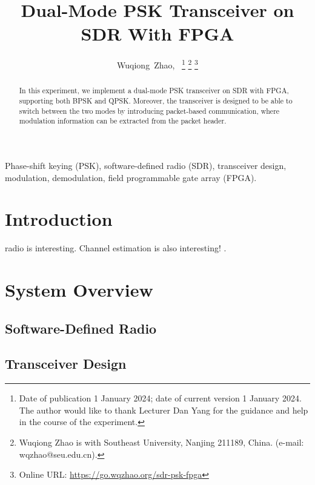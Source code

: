 \documentclass[journal,twoside]{IEEEtran}
\newcommand\orcidicon[1]{\href{https://orcid.org/#1}{\mbox{\scalerel*{
  \begin{tikzpicture}[yscale=-1,transform shape]
    \pic{orcidlogo};
  \end{tikzpicture}
}{|}}}}
\begin{document}
  \title{Dual-Mode PSK Transceiver on SDR With FPGA}

  \author{%
    Wuqiong~Zhao{\hspace{.1em}\textsuperscript{\orcidicon{0000-0002-9550-7423}}},~
    \thanks{Date of publication 1 January 2024; date of current version 1 January 2024.
      The author would like to thank Lecturer Dan Yang for the guidance and help in the course of the experiment.}
    \thanks{Wuqiong Zhao is with Southeast University, Nanjing 211189, China. (e-mail: wqzhao@seu.edu.cn).}
    \thanks{Online URL: \url{https://go.wqzhao.org/sdr-psk-fpga}}
  }

  \maketitle

  \begin{abstract}
    In this experiment, we implement a dual-mode PSK transceiver on SDR with FPGA,
    supporting both BPSK and QPSK.
    Moreover, the transceiver is designed to be able to switch between the two modes by introducing packet-based communication,
    where modulation information can be extracted from the packet header.
  \end{abstract}
  \begin{IEEEkeywords}
    Phase-shift keying (PSK), software-defined radio (SDR), transceiver design, modulation, demodulation, field programmable gate array (FPGA).
  \end{IEEEkeywords}

  \section{Introduction}

     radio is interesting.
    Channel estimation is also interesting!
    \cite{zhao2023ompl,you2023beam}.

  \section{System Overview}

    \subsection{Software-Defined Radio}

    \subsection{Transceiver Design}
\end{document}
